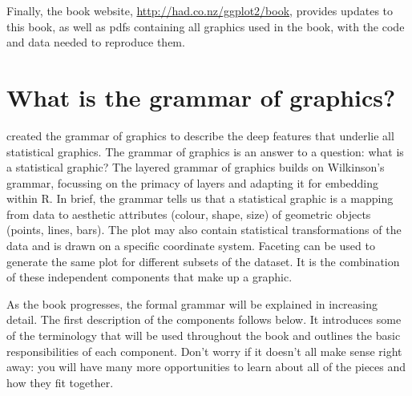 Finally, the book website, \url{http://had.co.nz/ggplot2/book}, provides updates to this book, as well as pdfs containing all graphics used in the book, with the code and data needed to reproduce them.   


\section{What is the grammar of graphics?}

\citet{wilkinson:2006} created the grammar of graphics to describe the deep features that underlie all statistical graphics.   The grammar of graphics is an answer to a question: what is a statistical graphic?  The layered grammar of graphics \citep{wickham:2007d} builds on Wilkinson's grammar, focussing on the primacy of layers and adapting it for embedding within R.  In brief, the grammar tells us that a statistical graphic is a mapping from data to  aesthetic attributes (colour, shape, size) of geometric objects (points, lines, bars).  The plot may also contain statistical transformations of the data and is drawn on a specific coordinate system.  Faceting can be used to generate the same plot for different subsets of the dataset.  It is the combination of these independent components that make up a graphic.  

As the book progresses, the formal grammar will be explained in increasing detail. The first description of the components follows below. It introduces some of the terminology that will be used throughout the book and outlines the basic responsibilities of each component.  Don't worry if it doesn't all make sense right away: you will have many more opportunities to learn about all of the pieces and how they fit together.

